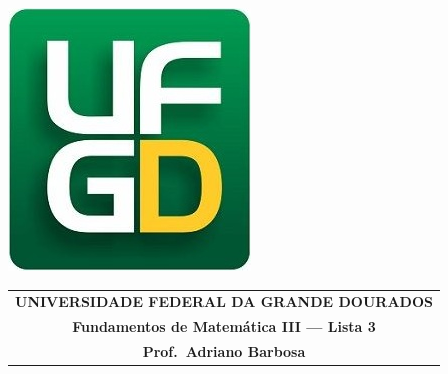 \documentclass[a4paper,5pt]{amsbook}
\begin{document}
\thispagestyle{empty}
\pagestyle{empty}
\begin{minipage}[h]{0.14\textwidth}
	\includegraphics[scale=0.24]{../ufgd.png}
\end{minipage}
\begin{minipage}[h]{\textwidth}
\begin{tabular}{c}
{{\bf UNIVERSIDADE FEDERAL DA GRANDE DOURADOS}}\\
{{\bf Fundamentos de Matem\'{a}tica III --- Lista 3}}\\
{{\bf Prof.\ Adriano Barbosa}}\\
\end{tabular}
\vspace{-0.45cm}
%
\end{minipage}

\end{document}
